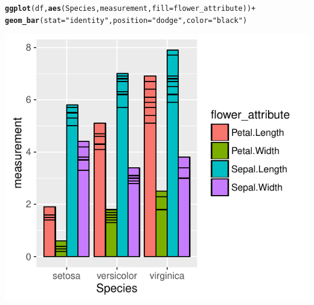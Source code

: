 \documentclass{beamer}\usepackage[]{graphicx}\usepackage[]{color}
\makeatletter
\newcommand{\hlstr}[1]{\textcolor[rgb]{0.192,0.494,0.8}{#1}}%
\newcommand{\hlopt}[1]{\textcolor[rgb]{0,0,0}{#1}}%
\newcommand{\hlstd}[1]{\textcolor[rgb]{0.345,0.345,0.345}{#1}}%
\newcommand{\hlkwc}[1]{\textcolor[rgb]{0.333,0.667,0.333}{#1}}%
\newcommand{\hlkwd}[1]{\textcolor[rgb]{0.737,0.353,0.396}{\textbf{#1}}}%
\newenvironment{kframe}{%
 \def\at@end@of@kframe{}%
 \ifinner\ifhmode%
  \def\at@end@of@kframe{\end{minipage}}%
  \begin{minipage}{\columnwidth}%
 \fi\fi%
 \def\FrameCommand##1{\hskip\@totalleftmargin \hskip-\fboxsep
 \colorbox{shadecolor}{##1}\hskip-\fboxsep
     \hskip-\linewidth \hskip-\@totalleftmargin \hskip\columnwidth}%
 \MakeFramed {\advance\hsize-\width
   \@totalleftmargin\z@ \linewidth\hsize
   \@setminipage}}%
 {\par\unskip\endMakeFramed%
 \at@end@of@kframe}
\newenvironment{knitrout}{}{} %
\makeatother
\begin{document}
\begin{frame}[fragile]
\begin{knitrout}\footnotesize
{}\color{fgcolor}\begin{kframe}
\begin{alltt}
\hlkwd{ggplot}\hlstd{(df,} \hlkwd{aes}\hlstd{(Species, measurement,} \hlkwc{fill} \hlstd{= flower_attribute))} \hlopt{+}
    \hlkwd{geom_bar}\hlstd{(}\hlkwc{stat} \hlstd{=} \hlstr{"identity"}\hlstd{,} \hlkwc{position}\hlstd{=}\hlstr{"dodge"}\hlstd{,} \hlkwc{color}\hlstd{=}\hlstr{"black"}\hlstd{)}
\end{alltt}
\end{kframe}

{\centering \includegraphics[width=.75\linewidth]{figure/barthree2-1} 

}



\end{knitrout}
\end{frame}

\end{document}
